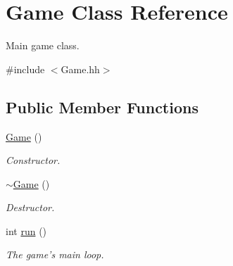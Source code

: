 \hypertarget{classGame}{\section{Game Class Reference}
\label{classGame}
}


Main game class.  




{\ttfamily \#include $<$Game.\-hh$>$}

\subsection*{Public Member Functions}
\begin{DoxyCompactItemize}
\item 
\hyperlink{classGame_ad59df6562a58a614fda24622d3715b65}{Game} ()
\begin{DoxyCompactList}\small\item\em Constructor. \end{DoxyCompactList}\item 
\hyperlink{classGame_ae3d112ca6e0e55150d2fdbc704474530}{$\sim$\-Game} ()
\begin{DoxyCompactList}\small\item\em Destructor. \end{DoxyCompactList}\item 
int \hyperlink{classGame_a99fb161fbbe87d25a8b73265a0611e58}{run} ()
\begin{DoxyCompactList}\small\item\em The game's main loop. \end{DoxyCompactList}\end{DoxyCompactItemize}
